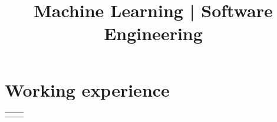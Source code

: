 \documentclass[11pt,a4paper,sans,english]{moderncv}
\title{Machine Learning | Software Engineering}
\makeatletter
\renewcommand*{\cventry}[6][.25em]{%
	\vspace{1.5mm}%
	\begin{tabular*}{\textwidth}{@{\extracolsep{\fill}}ll}%
		\ifthenelse{\equal{#3}{}}{}{\textbf{#3}} &
		\ifthenelse{\equal{#2}{}}{}{#4 #6 #2}\\%
	\end{tabular*}%
	\par\addvspace{#1}}
\makeatother
\begin{document}
	
	\newcommand{\jobdouble}[9]{%
		\cvdoubleitem{#3}{#1, #2, #4}{#7}{#5, #6, #8}
	}
	
	\makecvtitle
	\vspace*{-1cm} %
	
	\section{Working experience}
	\vspace*{-.15cm}
	\cventry{\scalebox{0.9}{\faCalendar\ 01/2025-- current}}{Machine Learning Engineer - Senior Consultant}{\scalebox{0.9}{\faBuilding\ \href{https://www.linksmt.it/}{\textit{Links Management \& Technology}}}}{}{\scalebox{0.9}{\faMapMarker\ Bari}}{}
	
\end{document}
